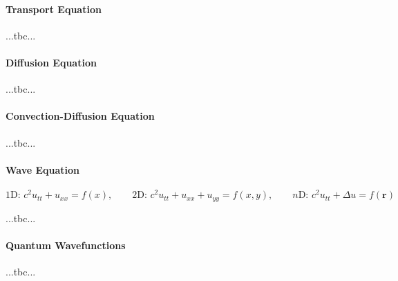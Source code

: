 \paragraph{Transport Equation} ...tbc...


\paragraph{Diffusion Equation} ...tbc...


\paragraph{Convection-Diffusion Equation} ...tbc...


\paragraph{Wave Equation}


\begin{equation}
1\text{D:  } c^2 u_{tt} + u_{xx} = f(x), \qquad 
2\text{D:  } c^2 u_{tt} + u_{xx} + u_{yy} = f(x,y), \qquad 
n\text{D:  } c^2 u_{tt} + \Delta u = f(\mathbf{r})
\end{equation}

 ...tbc...


\paragraph{Quantum Wavefunctions} ...tbc...

